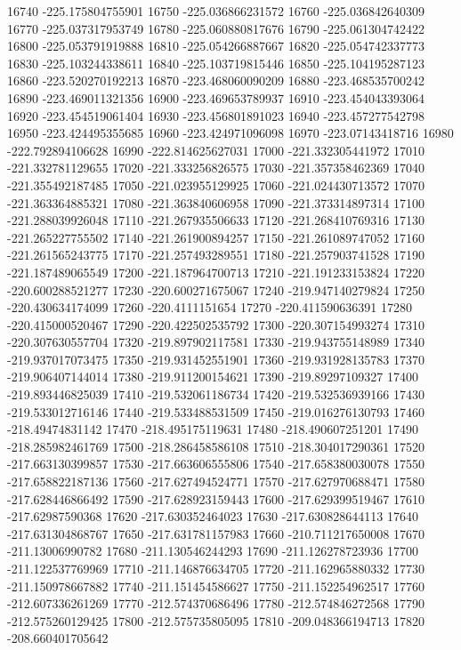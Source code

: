 {16740 -225.175804755901
16750 -225.036866231572
16760 -225.036842640309
16770 -225.037317953749
16780 -225.060880817676
16790 -225.061304742422
16800 -225.053791919888
16810 -225.054266887667
16820 -225.054742337773
16830 -225.103244338611
16840 -225.103719815446
16850 -225.104195287123
16860 -223.520270192213
16870 -223.468060090209
16880 -223.468535700242
16890 -223.469011321356
16900 -223.469653789937
16910 -223.454043393064
16920 -223.454519061404
16930 -223.456801891023
16940 -223.457277542798
16950 -223.424495355685
16960 -223.424971096098
16970 -223.07143418716
16980 -222.792894106628
16990 -222.814625627031
17000 -221.332305441972
17010 -221.332781129655
17020 -221.333256826575
17030 -221.357358462369
17040 -221.355492187485
17050 -221.023955129925
17060 -221.024430713572
17070 -221.363364885321
17080 -221.363840606958
17090 -221.373314897314
17100 -221.288039926048
17110 -221.267935506633
17120 -221.268410769316
17130 -221.265227755502
17140 -221.261900894257
17150 -221.261089747052
17160 -221.261565243775
17170 -221.257493289551
17180 -221.257903741528
17190 -221.187489065549
17200 -221.187964700713
17210 -221.191233153824
17220 -220.600288521277
17230 -220.600271675067
17240 -219.947140279824
17250 -220.430634174099
17260 -220.4111151654
17270 -220.411590636391
17280 -220.415000520467
17290 -220.422502535792
17300 -220.307154993274
17310 -220.307630557704
17320 -219.897902117581
17330 -219.943755148989
17340 -219.937017073475
17350 -219.931452551901
17360 -219.931928135783
17370 -219.906407144014
17380 -219.911200154621
17390 -219.89297109327
17400 -219.893446825039
17410 -219.532061186734
17420 -219.532536939166
17430 -219.533012716146
17440 -219.533488531509
17450 -219.016276130793
17460 -218.49474831142
17470 -218.495175119631
17480 -218.490607251201
17490 -218.285982461769
17500 -218.286458586108
17510 -218.304017290361
17520 -217.663130399857
17530 -217.663606555806
17540 -217.658380030078
17550 -217.658822187136
17560 -217.627494524771
17570 -217.627970688471
17580 -217.628446866492
17590 -217.628923159443
17600 -217.629399519467
17610 -217.62987590368
17620 -217.630352464023
17630 -217.630828644113
17640 -217.631304868767
17650 -217.631781157983
17660 -210.711217650008
17670 -211.13006990782
17680 -211.130546244293
17690 -211.126278723936
17700 -211.122537769969
17710 -211.146876634705
17720 -211.162965880332
17730 -211.150978667882
17740 -211.151454586627
17750 -211.152254962517
17760 -212.607336261269
17770 -212.574370686496
17780 -212.574846272568
17790 -212.575260129425
17800 -212.575735805095
17810 -209.048366194713
17820 -208.660401705642
}
